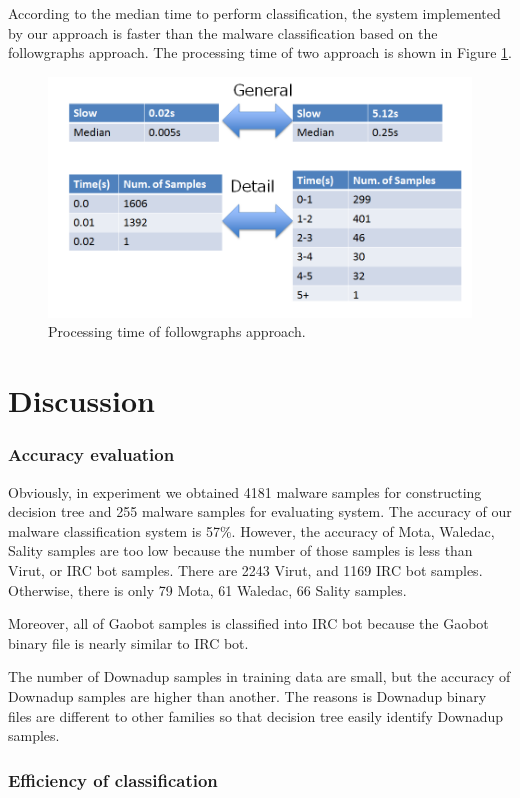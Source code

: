 According to the median time to perform classification, the system implemented by our approach is faster than the malware classification based on the followgraphs approach. The processing time of two approach is shown in Figure \ref{fig:evaluation5}.
\begin{figure}[h!]
\centering
\includegraphics[width=1\textwidth]
{graph/evaluation5.png}
\caption{Processing time of followgraphs approach.}
\label{fig:evaluation5}
\end{figure}
\section{Discussion}
\subsubsection{Accuracy evaluation}
Obviously, in experiment we obtained 4181 malware samples for constructing decision tree and 255 malware samples for evaluating system. The accuracy of our malware classification system is 57\%. However, the accuracy of Mota, Waledac, Sality samples are too low because the number of those samples is less than Virut, or IRC bot samples. There are 2243 Virut, and 1169 IRC bot samples. Otherwise, there is only 79 Mota, 61 Waledac, 66 Sality samples.

Moreover, all of Gaobot samples is classified into IRC bot because the Gaobot binary file is nearly similar to IRC bot.

The number of Downadup samples in training data are small, but the accuracy of Downadup samples are higher than another. The reasons is Downadup binary files are different to other families so that decision tree easily identify Downadup samples.  

\subsubsection{Efficiency of classification}

